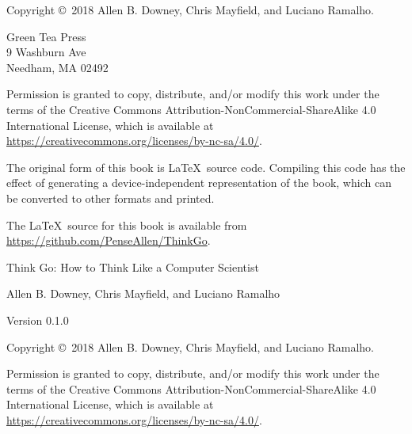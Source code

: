 \documentclass[12pt]{book}
\newcommand{\thetitle}{Think Go}
\newcommand{\thesubtitle}{How to Think Like a Computer Scientist}
\newcommand{\theauthors}{Allen B. Downey, Chris Mayfield, and Luciano Ramalho}
\newcommand{\theversion}{0.1.0}
\theoremstyle{exercise}
\begin{document}
\begin{latexonly}
\newpage
\thispagestyle{empty}

Copyright \copyright ~2018 \theauthors.

\vspace{0.2in}

\begin{flushleft}
Green Tea Press \\
9 Washburn Ave \\
Needham, MA 02492
\end{flushleft}

Permission is granted to copy, distribute, and/or modify this work under the terms of the Creative Commons Attribution-NonCommercial-ShareAlike 4.0 International License, which is available at \url{https://creativecommons.org/licenses/by-nc-sa/4.0/}.

The original form of this book is \LaTeX\ source code.
Compiling this code has the effect of generating a device-independent representation of the book, which can be converted to other formats and printed.

The \LaTeX\ source for this book is available from \url{https://github.com/PenseAllen/ThinkGo}.


\cleardoublepage
\setcounter{tocdepth}{1}
\tableofcontents

\end{latexonly}


\begin{htmlonly}

\vspace{1em}

{\Large \thetitle: \thesubtitle}

{\large \theauthors}

Version \theversion

\vspace{1em}

Copyright \copyright ~2018 \theauthors.

Permission is granted to copy, distribute, and/or modify this work under the terms of the Creative Commons Attribution-NonCommercial-ShareAlike 4.0 International License, which is available at \url{https://creativecommons.org/licenses/by-nc-sa/4.0/}.

\vspace{1em}

\end{htmlonly}
\end{document}
